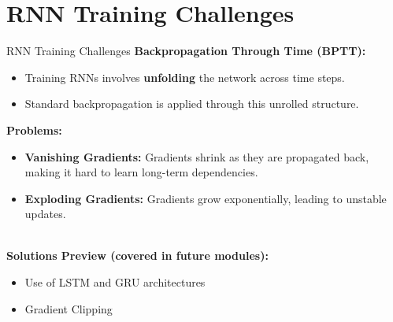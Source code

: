\section{RNN Training Challenges}
\begin{frame}[allowframebreaks]{RNN Training Challenges}
    \textbf{Backpropagation Through Time (BPTT):}
    \begin{itemize}
        \item Training RNNs involves \textbf{unfolding} the network across time steps.
        \item Standard backpropagation is applied through this unrolled structure.
    \end{itemize}

\framebreak
    \textbf{Problems:}
    \begin{itemize}
        \item \textbf{Vanishing Gradients:} Gradients shrink as they are propagated back, making it hard to learn long-term dependencies.
        \item \textbf{Exploding Gradients:} Gradients grow exponentially, leading to unstable updates.
    \end{itemize}
    \\[2em]
    \textbf{Solutions Preview (covered in future modules):}
    \begin{itemize}
        \item Use of LSTM and GRU architectures
        \item Gradient Clipping
    \end{itemize}
\end{frame}


